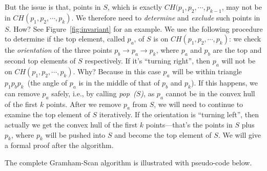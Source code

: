 But the issue is that, points in $S$, which is exactly $CH(p_1, p_2, \cdots, p_{k-1}$, may not be in
$CH(p_1, p_2, \cdots, p_k)$.  We therefore need to \emph{determine} and \emph{exclude} such points in $S$.
How? See Figure~\ref{fig:invariant} for an example.
We use the following procedure to determine if the top element, called $p_a$, of $S$ is on 
$CH(p_1, p_2, \cdots, p_k)$: we check the \emph{orientation} of the three points $p_b \to p_a \to p_k$,
where $p_a$ and $p_b$ are the top and second top elements of $S$ respectively.
If it's ``turning right'', then $p_a$ will not be on $CH(p_1, p_2, \cdots, p_k)$.
Why? Because in this case $p_a$ will be within triangle $p_1p_bp_k$~(the angle of $p_a$ is in the middle of that of $p_b$ and $p_k$).
If this happens, we can remove $p_a$ safely, i.e., by calling \emph{pop~($S$)}, as $p_a$ cannot be in the convex hull of the first $k$ points.
After we remove $p_a$ from $S$, we will need to continue to examine the top element of $S$ iteratively.
If the orientation is ``turning left'', then actually we get the convex hull of the first $k$ points---that's the points in $S$ plus $p_k$, where $p_k$ will be 
pushed into $S$ and become the top element of $S$. We will give a formal proof after the algorithm.



The complete Gramham-Scan algorithm is illustrated with pseudo-code below.

\begin{minipage}{0.8\textwidth}
	\xxx
	\xxx
	\xxx
	\xxx
	\xxx
	\xxx
\end{minipage}

\begin{minipage}{0.8\textwidth}
	\xxx
	\xxx
	\xxx
	\xxx
	\xxx
	\xxx
	\xxx
	\xxx
	\xxx
	\xxx
	\xxx
	\xxx
	\xxx
	\xxx
	\xxx
\end{minipage}

